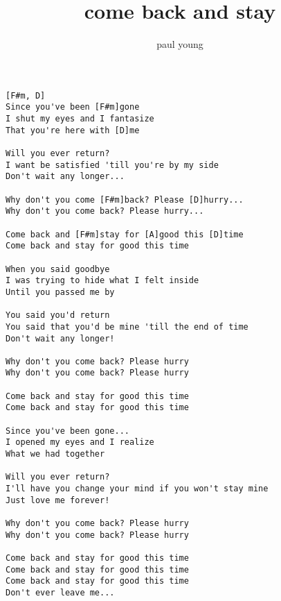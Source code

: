 \author{paul young}
\title{come back and stay}
\maketitle
\begin{verbatim}
[F#m, D]
Since you've been [F#m]gone
I shut my eyes and I fantasize
That you're here with [D]me

Will you ever return?
I want be satisfied 'till you're by my side
Don't wait any longer...

Why don't you come [F#m]back? Please [D]hurry...
Why don't you come back? Please hurry...

Come back and [F#m]stay for [A]good this [D]time
Come back and stay for good this time

When you said goodbye
I was trying to hide what I felt inside
Until you passed me by

You said you'd return
You said that you'd be mine 'till the end of time
Don't wait any longer!

Why don't you come back? Please hurry
Why don't you come back? Please hurry

Come back and stay for good this time
Come back and stay for good this time

Since you've been gone...
I opened my eyes and I realize
What we had together

Will you ever return?
I'll have you change your mind if you won't stay mine
Just love me forever!

Why don't you come back? Please hurry
Why don't you come back? Please hurry

Come back and stay for good this time
Come back and stay for good this time
Come back and stay for good this time
Don't ever leave me...
\end{verbatim}
